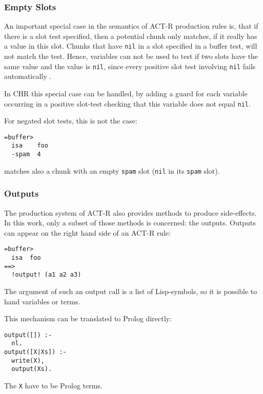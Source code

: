 \subsubsection{Empty Slots}

An important special case in the semantics of ACT-R production rules is, that if there is a slot test specified, then a potential chunk only matches, if it really has a value in this slot. Chunks that have \verb|nil| in a slot specified in a buffer test, will not match the test. Hence, variables can not be used to test if two slots have the same value and the value is \verb|nil|, since every positive slot test involving \verb|nil| fails automatically \cite[p. 164, section ``Variables'', last sentence]{actr_reference}.

In CHR this special case can be handled, by adding a guard for each variable occurring in a positive slot-test checking that this variable does not equal \verb|nil|.

For negated slot tests, this is not the case: 

\begin{lstlisting}
=buffer>
  isa    foo
  -spam  4
\end{lstlisting}

matches also a chunk with an empty \verb|spam| slot (\verb|nil| in its \verb|spam| slot).



\subsubsection{Outputs}

The production system of ACT-R also provides methods to produce side-effects. In this work, only a subset of those methods is concerned: the outputs. Outputs can appear on the right hand side of an ACT-R rule:

\begin{lstlisting}
=buffer>
  isa  foo
==>
  !output! (a1 a2 a3)
\end{lstlisting}

The argument of such an output call is a list of Lisp-symbols, so it is possible to hand variables or terms.

This mechanism can be translated to Prolog directly:

\begin{lstlisting}
output([]) :-
  nl.
output([X|Xs]) :-
  write(X),
  output(Xs).
\end{lstlisting}

The \verb|X| have to be Prolog terms.


